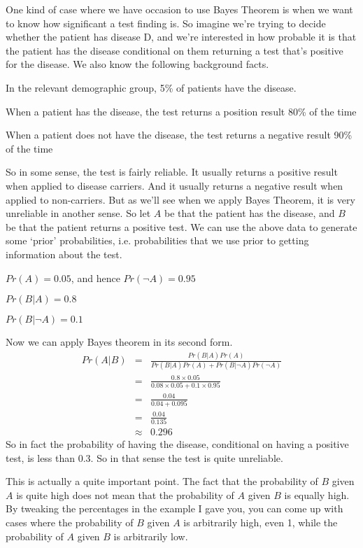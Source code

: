 One kind of case where we have occasion to use Bayes Theorem is when we want to know how significant a test finding is. So imagine we're trying to decide whether the patient has disease D, and we're interested in how probable it is that the patient has the disease conditional on them returning a test that's positive for the disease. We also know the following background facts.
\begin{itemize*}
\item In the relevant demographic group, 5\% of patients have the disease.
\item When a patient has the disease, the test returns a position result 80\% of the time
\item When a patient does not have the disease, the test returns a negative result 90\% of the time
\end{itemize*}
\noindent So in some sense, the test is fairly reliable. It usually returns a positive result when applied to disease carriers. And it usually returns a negative result when applied to non-carriers. But as we'll see when we apply Bayes Theorem, it is very unreliable in another sense. So let $A$ be that the patient has the disease, and $B$ be that the patient returns a positive test. We can use the above data to generate some `prior' probabilities, i.e. probabilities that we use prior to getting information about the test.
\begin{itemize*}
\item $Pr(A) = 0.05$, and hence $Pr(\neg A) = 0.95$
\item $Pr(B | A) = 0.8$
\item $Pr(B | \neg A) = 0.1$
\end{itemize*}
\noindent Now we can apply Bayes theorem in its second form.
\begin{eqnarray*}
Pr(A|B) &=& \frac{Pr(B|A) Pr(A)}{Pr(B|A)Pr(A) + Pr(B|\neg A)Pr(\neg A)} \\
 &=& \frac{0.8 \times 0.05}{0.08 \times 0.05 + 0.1 \times 0.95}  \\
 &=& \frac{0.04}{0.04 + 0.095} \\
 &=& \frac{0.04}{0.135} \\
 &\approx& 0.296
\end{eqnarray*} So in fact the probability of having the disease, conditional on having a positive test, is less than 0.3. So in that sense the test is quite unreliable.

This is actually a quite important point. The fact that the probability of $B$ given $A$ is quite high does not mean that the probability of $A$ given $B$ is equally high. By tweaking the percentages in the example I gave you, you can come up with cases where the probability of $B$ given $A$ is arbitrarily high, even 1, while the probability of $A$ given $B$ is arbitrarily low.

